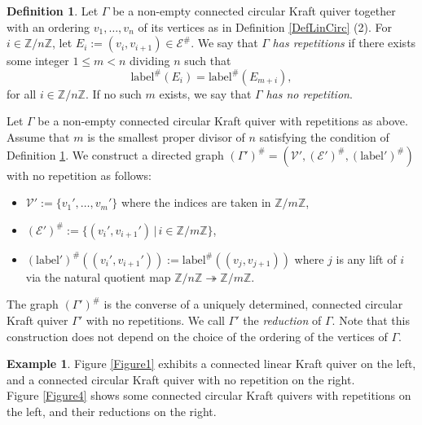 \documentclass[12pt]{amsart}
\theoremstyle{definition}
\newtheorem{definition}[theorem]{Definition}
\newtheorem{example}[theorem]{Example}
\newcommand{\<}{\langle}   %
\renewcommand{\>}{\rangle} %
\begin{document}
\begin{definition}\label{DefRepetition}
    Let $\Gamma$ be a non-empty connected circular Kraft quiver together with an ordering $v_1,\ldots ,v_n$ of its vertices as in Definition \ref{DefLinCirc} (2). For $i \in \mathbb Z/n\mathbb Z$, let $E_i := (v_i,v_{i+1}) \in \mathcal E^{\#}$. We say that $\Gamma$ \textit{has repetitions} if there exists some integer $1 \leq m < n$ dividing $n$ such that 
    \begin{equation*}
        \mathrm{label}^{\#}(E_i) = \mathrm{label}^{\#}(E_{m+i}),
    \end{equation*}
    for all $i \in \mathbb Z/n\mathbb Z$. If no such $m$ exists, we say that $\Gamma$ \textit{has no repetition}.
\end{definition}

Let $\Gamma$ be a non-empty connected circular Kraft quiver with repetitions as above. Assume that $m$ is the smallest proper divisor of $n$ satisfying the condition of Definition \ref{DefRepetition}. We construct a directed graph $(\Gamma')^{\#} = (\mathcal V',(\mathcal E')^{\#},(\mathrm{label}')^{\#})$ with no repetition as follows:
\begin{itemize}
    \item $\mathcal V' := \{v_1',\ldots , v_m'\}$ where the indices are taken in $\mathbb Z/m\mathbb Z$,
    \item $(\mathcal E')^{\#} := \{(v_i',v_{i+1}')\,|\, i \in \mathbb Z/m\mathbb Z\}$,
    \item $(\mathrm{label}')^{\#}((v_i',v_{i+1}')) := \mathrm{label}^{\#}((v_j,v_{j+1}))$ where $j$ is any lift of $i$ via the natural quotient map $\mathbb Z/n\mathbb Z \twoheadrightarrow \mathbb Z/m\mathbb Z$.
\end{itemize}
The graph $(\Gamma')^{\#}$ is the converse of a uniquely determined, connected circular Kraft quiver $\Gamma'$ with no repetitions. We call $\Gamma'$ the \textit{reduction} of $\Gamma$. Note that this construction does not depend on the choice of the ordering of the vertices of $\Gamma$.

\begin{example}
    Figure \ref{Figure1} exhibits a connected linear Kraft quiver on the left, and a connected circular Kraft quiver with no repetition on the right.\\
    Figure \ref{Figure4} shows some connected circular Kraft quivers with repetitions on the left, and their reductions on the right.
\end{example}
\end{document}
